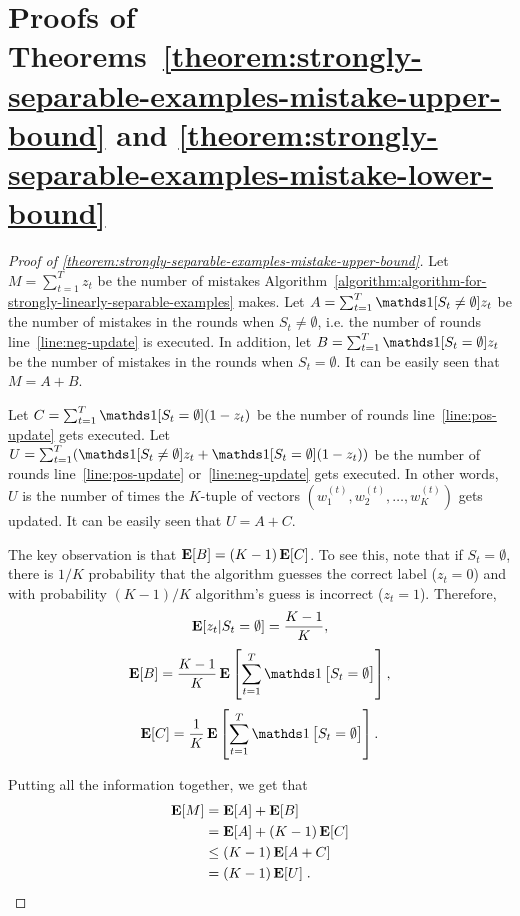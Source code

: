 \section{Proofs of Theorems~\ref{theorem:strongly-separable-examples-mistake-upper-bound} and \ref{theorem:strongly-separable-examples-mistake-lower-bound}}
\label{section:proofs-for-stringly-separable-examples}

\begin{proof}[Proof of \autoref{theorem:strongly-separable-examples-mistake-upper-bound}]
Let $M = \sum_{t=1}^T z_t$ be the number of mistakes
Algorithm~\ref{algorithm:algorithm-for-strongly-linearly-separable-examples}
makes. Let $A = \sum_{t=1}^T \one[S_t \neq \emptyset] z_t$ be the number of
mistakes in the rounds when $S_t \neq \emptyset$, i.e. the number of rounds
line~\ref{line:neg-update} is executed. In addition, let $B = \sum_{t=1}^T
\one[S_t = \emptyset] z_t$ be the number of mistakes in the rounds when $S_t =
\emptyset$. It can be easily seen that $M = A + B$.

Let $C = \sum_{t=1}^T \one[S_t = \emptyset](1 - z_t)$ be the number of rounds
line~\ref{line:pos-update} gets executed. Let $U = \sum_{t=1}^T (\one[S_t \neq
\emptyset] z_t + \one[S_t = \emptyset](1 - z_t))$ be the number of rounds
line~\ref{line:pos-update} or~\ref{line:neg-update} gets executed. In other
words, $U$ is the number of times the $K$-tuple of vectors $(w_1^{(t)},
w_2^{(t)}, \dots, w_K^{(t)})$ gets updated. It can be easily seen that $U = A +
C$.

The key observation is that $\operatorname*{\mathbf{E}}[B] = (K-1) \operatorname*{\mathbf{E}}[C]$.
To see this, note that if $S_t = \emptyset$, there is $1/K$ probability that the algorithm
guesses the correct label ($z_t = 0$) and with probability $(K-1)/K$ algorithm's guess is
incorrect ($z_t = 1$). Therefore,
\[ \operatorname*{\mathbf{E}}[ z_t |S_t = \emptyset] = \frac{K-1}{K}, \]
\[ \Exp[B] = \frac{K-1}{K} \Exp \sbr{ \sum_{t=1}^T \indicator{S_t = \emptyset} }, \]
\[ \Exp[C] = \frac{1}{K} \Exp \sbr{ \sum_{t=1}^T \indicator{S_t = \emptyset} }. \]

Putting all the information together, we get that
\begin{align}
\operatorname*{\mathbf{E}}[M]
& = \operatorname*{\mathbf{E}}[A] + \operatorname*{\mathbf{E}}[B] \nonumber \\
& = \operatorname*{\mathbf{E}}[A] + (K-1) \operatorname*{\mathbf{E}}[C] \nonumber \\
& \le (K-1) \operatorname*{\mathbf{E}}[A + C] \nonumber\\
& = (K-1) \operatorname*{\mathbf{E}}[U]  \; .
\label{eqn:mistake-update}
\end{align}


\end{proof}
